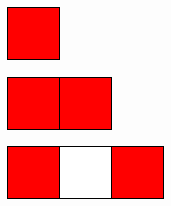 \begin{figure}[]
\centering
\begin{subfigure}{0.03\textwidth}
	\includegraphics[width=\textwidth]{figures/1/1x1x1.pdf}
\end{subfigure} \hfill%
\begin{subfigure}{0.064\textwidth}
	\includegraphics[width=\textwidth]{figures/1/1x2x1.pdf}
\end{subfigure} \hfill%
\begin{subfigure}{0.1\textwidth}
	\includegraphics[width=\textwidth]{figures/1/1x3x1.pdf}

\end{subfigure}
\end{figure}
